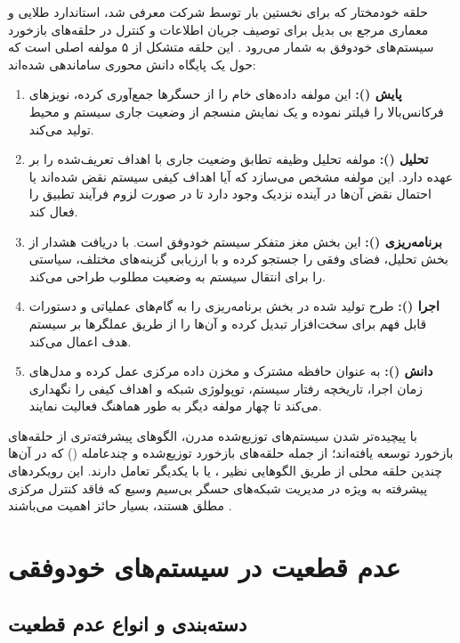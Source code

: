 \documentclass[oneside,openany,phd]{TMU-Thesis}
\begin{document}
حلقه خودمختار  که برای نخستین بار توسط شرکت  معرفی شد، استاندارد طلایی و معماری مرجع بی بدیل برای توصیف جریان اطلاعات و کنترل در حلقه‌های بازخورد سیستم‌های خودوفق به شمار می‌رود \cite{kephart2003vision}. این حلقه متشکل از ۵ مولفه اصلی است که حول یک پایگاه دانش محوری ساماندهی شده‌اند:
\begin{enumerate}
    \item \textbf{پایش ():} این مولفه داده‌های خام را از حسگرها جمع‌آوری کرده، نویزهای فرکانس‌بالا را فیلتر نموده و یک نمایش منسجم از وضعیت جاری سیستم و محیط تولید می‌کند.
    \item \textbf{تحلیل ():} مولفه تحلیل وظیفه تطابق وضعیت جاری با اهداف تعریف‌شده را بر عهده دارد. این مولفه مشخص می‌سازد که آیا اهداف کیفی سیستم نقض شده‌اند یا احتمال نقض آن‌ها در آینده نزدیک وجود دارد تا در صورت لزوم فرآیند تطبیق را فعال کند.
    \item \textbf{برنامه‌ریزی ():} این بخش مغز متفکر سیستم خودوفق است. با دریافت هشدار از بخش تحلیل، فضای وفقی را جستجو کرده و با ارزیابی گزینه‌های مختلف، سیاستی را برای انتقال سیستم به وضعیت مطلوب طراحی می‌کند.
    \item \textbf{اجرا ():} طرح تولید شده در بخش برنامه‌ریزی را به گام‌های عملیاتی و دستورات قابل فهم برای سخت‌افزار تبدیل کرده و آن‌ها را از طریق عملگرها بر سیستم هدف اعمال می‌کند.
    \item \textbf{دانش ():} به عنوان حافظه مشترک و مخزن داده مرکزی عمل کرده و مدل‌های زمان اجرا، تاریخچه رفتار سیستم، توپولوژی شبکه و اهداف کیفی را نگهداری می‌کند تا چهار مولفه دیگر به طور هماهنگ فعالیت نمایند.
\end{enumerate}

با پیچیده‌تر شدن سیستم‌های توزیع‌شده مدرن، الگوهای پیشرفته‌تری از حلقه‌های بازخورد توسعه یافته‌اند؛ از جمله حلقه‌های بازخورد توزیع‌شده و چندعامله () \cite{weyns2018applying, delemos2017software} که در آن‌ها چندین حلقه محلی از طریق الگوهایی نظیر ،  یا  با یکدیگر تعامل دارند. این رویکردهای پیشرفته به ویژه در مدیریت شبکه‌های حسگر بی‌سیم وسیع که فاقد کنترل مرکزی مطلق هستند، بسیار حائز اهمیت می‌باشند \cite{weyns2018applying, delemos2017software}.

\section{عدم قطعیت در سیستم‌های خودوفقی}

\subsection{دسته‌بندی و انواع عدم قطعیت}
\end{document}
